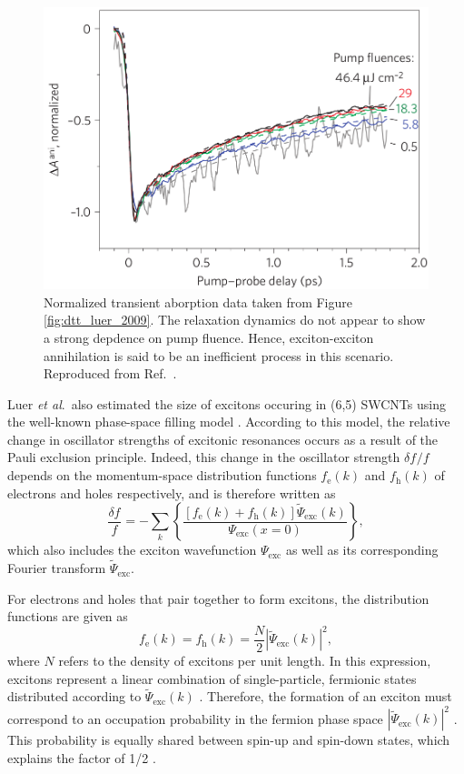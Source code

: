 \begin{figure}[ht]
	\centering
	\includegraphics[scale=1.2]{images/chapter_prior_works/dtt_3_luer_2009}
	\caption{Normalized transient aborption data taken from Figure \ref{fig:dtt_luer_2009}. The relaxation dynamics do not appear to show a strong depdence on pump fluence. Hence, exciton-exciton annihilation is said to be an inefficient process in this scenario. Reproduced from Ref.\ \cite{luer2009size}.}
	\label{fig:dtt_2_luer_2009}
\end{figure}

Luer \textit{et al}.\ also estimated the size of excitons occuring in (6,5) SWCNTs using the well-known phase-space filling model \cite{schmitt1985theory, greene1990all}. According to this model, the relative change in oscillator strengths of excitonic resonances occurs as a result of the Pauli exclusion principle. Indeed, this change in the oscillator strength $\delta f_\text{}/ f_\text{}$ depends on the momentum-space distribution functions $f_\text{e}(k)$ and $f_\text{h}(k)$ of electrons and holes respectively, and is therefore written as
\begin{equation}
	\frac{\delta f_\text{}}{f_\text{}} = - \sum_{k} \left\{ \frac{ [ f_\text{e}(k) + f_\text{h}(k)] \tilde{\Psi}_\text{exc}(k)}{\Psi_\text{exc}(x=0)} \right\},
	\label{eq:osc_strength}
\end{equation}
which also includes the exciton wavefunction $\Psi_\text{exc}$ as well as its corresponding Fourier transform $\tilde{\Psi}_\text{exc}$.

For electrons and holes that pair together to form excitons, the distribution functions are given as
%
\begin{equation}
	f_\text{e}(k) = f_\text{h}(k) = \frac{N}{2} | \tilde{\Psi}_\text{exc}(k)|^2,
\end{equation}
%
where $N$ refers to the density of excitons per unit length. In this expression, excitons represent a linear combination of single-particle, fermionic states distributed according to $\tilde{\Psi}_\text{exc}(k)$ \cite{schmitt1985theory}. Therefore, the formation of an exciton must correspond to an occupation probability in the fermion phase space $|\tilde{\Psi}_\text{exc}(k)|^2$ \cite{schmitt1985theory}. This probability is equally shared between spin-up and spin-down states, which explains the factor of 1/2 \cite{schmitt1985theory}.

